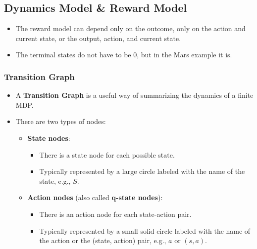 \begin{example}
    
\end{example}

\subsection{Dynamics Model \& Reward Model}
\begin{definition}
    \begin{itemize}
        \item The reward model can depend only on the outcome, only on the action and current state, or the output, action, and current state. 
        \item The terminal states do not have to be 0, but in the Mars example it is. 
    \end{itemize}
\end{definition}
\begin{example}
    
\end{example}

\begin{example}
    
\end{example}

\subsubsection{Transition Graph}
\begin{definition}
    \begin{itemize}
        \item A \textbf{Transition Graph} is a useful way of summarizing the dynamics of a finite MDP.
        
        \item There are two types of nodes:
        \begin{itemize}
            \item \textbf{State nodes}:
            \begin{itemize}
                \item There is a state node for each possible state.
                \item Typically represented by a large circle labeled with the name of the state, e.g., \( S \).
            \end{itemize}
            
            \item \textbf{Action nodes} (also called \textbf{q-state nodes}):
            \begin{itemize}
                \item There is an action node for each state-action pair.
                \item Typically represented by a small solid circle labeled with the name of the action or the (state, action) pair, e.g., \( a \) or \( (s, a) \).
            \end{itemize}
        \end{itemize}
    \end{itemize}
\end{definition}

